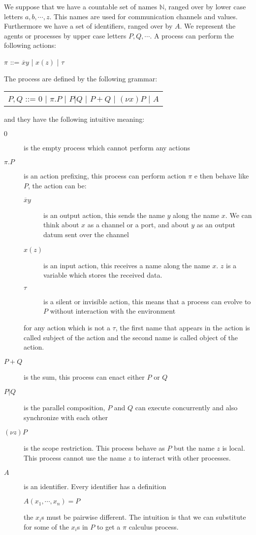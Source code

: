 We suppose that we have a countable set of names $\mathbb{N}$, ranged over by lower case letters $a,b, \cdots, z$. This names are used for communication channels and values. Furthermore we have a set of identifiers, ranged over by $A$. We represent the agents or processes by upper case letters $P,Q, \cdots $. A process can perform the following actions:
\begin{center}
  $\pi$ ::= $\overline{x}y$ | $x(z)$ | $\tau$ 
\end{center}
The process are defined by the following grammar:
\begin{center}
  \begin{tabular}{l}
    $P,Q$ ::= $0$ | $\pi.P$ | $P|Q$ | $P+Q$ | $(\nu x) P$ | $A$ 
  \end{tabular}
\end{center}
and they have the following intuitive meaning:
\begin{description}
  \item[$0$] 
    is the empty process which cannot perform any actions
  \item[$\pi.P$] 
    is an action prefixing, this process can perform action $\pi$ e then behave like $P$, the action can be:
    \begin{description}
      \item[$\overline{x}y$] 
	is an output action, this sends the name $y$ along the name $x$. We can think about $x$ as a channel or a port, and about $y$ as an output datum sent over the channel
      \item[$x(z)$] 
	is an input action, this receives a name along the name $x$. $z$ is a variable which stores the received data.
      \item[$\tau$] 
	is a silent or invisible action, this means that a process can evolve to $P$ without interaction with the environment 
    \end{description}
    for any action which is not a $\tau$, the first name that appears in the action is called subject of the action and the second name is called object of the action.
  \item[$P+Q$] 
    is the sum, this process can enact either $P$ or $Q$
  \item[$P|Q$] 
    is the parallel composition, $P$ and $Q$ can execute concurrently and also synchronize with each other
  \item[$(\nu z) P$] 
    is the scope restriction. This process behave as $P$ but the name $z$ is local. This process cannot use the name $z$ to interact with other processes.
  \item[$A$] 
    is an identifier. Every identifier has a definition
    \begin{center}
      $A(x_{1}, \cdots, x_{n})=P$
    \end{center}
    the $x_{i}$s must be pairwise different. The intuition is that we can substitute for some of the $x_{i}$s in $P$ to get a $\pi$ calculus process. 
\end{description}

